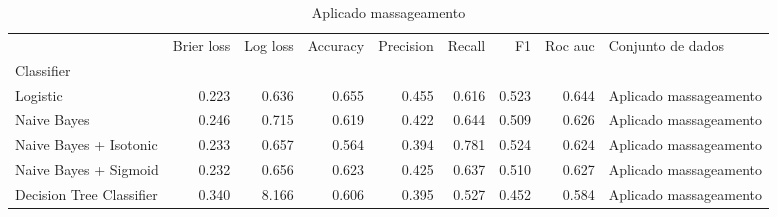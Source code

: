 \begin{table}
\centering
\caption{Aplicado massageamento}
\label{Aplicado massageamento 1}
\begin{tabular}{lrrrrrrrl}
\toprule
{} &  Brier  loss &  Log loss &  Accuracy  &  Precision  &  Recall  &    F1  &  Roc auc  &       Conjunto de dados \\
Classifier               &              &           &            &             &          &        &           &                         \\
\midrule
Logistic                 &        0.223 &     0.636 &      0.655 &       0.455 &    0.616 &  0.523 &     0.644 &  Aplicado massageamento \\
Naive Bayes              &        0.246 &     0.715 &      0.619 &       0.422 &    0.644 &  0.509 &     0.626 &  Aplicado massageamento \\
Naive Bayes + Isotonic   &        0.233 &     0.657 &      0.564 &       0.394 &    0.781 &  0.524 &     0.624 &  Aplicado massageamento \\
Naive Bayes + Sigmoid    &        0.232 &     0.656 &      0.623 &       0.425 &    0.637 &  0.510 &     0.627 &  Aplicado massageamento \\
Decision Tree Classifier &        0.340 &     8.166 &      0.606 &       0.395 &    0.527 &  0.452 &     0.584 &  Aplicado massageamento \\
\bottomrule
\end{tabular}
\end{table}
